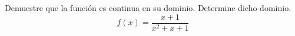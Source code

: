 \setcounter{enumi}{30}
\item Demuestre que la función es continua en su dominio. Determine dicho dominio.
$$f(x) = \frac{x+1}{x^2+x+1}$$
